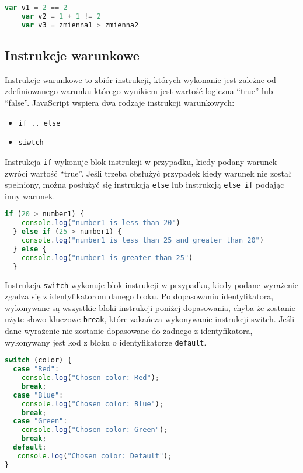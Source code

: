   \begin{lstlisting}[language=JavaScript, caption=Przykład użycia operatorów porównania, label=alg:operatoryPorownania1]
    var v1 = 2 == 2
    var v2 = 1 + 1 != 2
    var v3 = zmienna1 > zmienna2
  \end{lstlisting}

\subsection{Instrukcje warunkowe}
Instrukcje warunkowe to zbiór instrukcji, których wykonanie jest zależne od zdefiniowanego warunku którego wynikiem jest wartość logiczna ``true'' lub ``false''. JavaScript wspiera dwa rodzaje instrukcji warunkowych:
\begin{itemize}
  \item \texttt{if .. else}
  \item \texttt{siwtch}
\end{itemize}
\par Instrukcja \texttt{if} wykonuje blok instrukcji w przypadku, kiedy podany warunek zwróci wartość ``true''. Jeśli trzeba obsłużyć przypadek kiedy warunek nie został spełniony, można posłużyć się instrukcją \texttt{else} lub instrukcją \texttt{else if} podając inny warunek.

\begin{lstlisting}[language=JavaScript, caption=Przykład użycia instrukcji \texttt{if .. else}, label=alg:instrukcjaIfElese1]
  if (20 > number1) {
    console.log("number1 is less than 20")
  } else if (25 > number1) {
    console.log("number1 is less than 25 and greater than 20")
  } else {
    console.log("number1 is greater than 25")
  }
\end{lstlisting}

\par Instrukcja \texttt{switch} wykonuje blok instrukcji w przypadku, kiedy podane wyrażenie zgadza się z identyfikatorom danego bloku. Po dopasowaniu identyfikatora, wykonywane są wszystkie bloki instrukcji poniżej dopasowania, chyba że zostanie użyte słowo kluczowe \texttt{break}, które zakańcza wykonywanie instrukcji switch. Jeśli dane wyrażenie nie zostanie dopasowane do żadnego z identyfikatora, wykonywany jest kod z bloku o identyfikatorze \texttt{default}.

\begin{lstlisting}[language=JavaScript, caption=Przykład użycia instrukcji \texttt{switch}, label=alg:instrukcjaSwitch1]
  switch (color) {
  case "Red":
    console.log("Chosen color: Red");
    break;
  case "Blue":
    console.log("Chosen color: Blue");
    break;
  case "Green":
    console.log("Chosen color: Green");
    break;
  default:
   console.log("Chosen color: Default");
}
\end{lstlisting}


